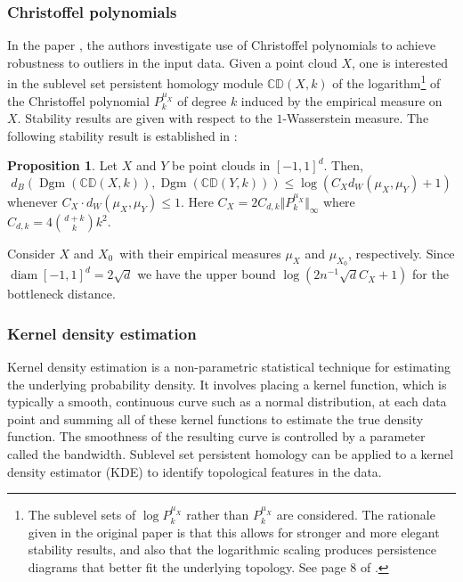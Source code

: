 \documentclass[10pt,a4paper]{article}
\theoremstyle{definition}
\newtheorem{prop}{Proposition}[thm]
\newcommand{\R}{\mathbb{R}}
\begin{document}
\subsubsection{Christoffel polynomials \autocite{Hoefgeest2022}}
In the paper \autocite{Hoefgeest2022}, the authors investigate use of Christoffel polynomials to achieve robustness to outliers in the input data. Given a point cloud $X$, one is interested in the sublevel set persistent homology module $\mathbb{CD}(X,k)$ of the logarithm\footnote{The sublevel sets of $\log P_k^{\mu_X}$ rather than $P_k^{\mu_X}$ are considered. The rationale given in the original paper is that this allows for stronger and more elegant stability results, and also that the logarithmic scaling produces persistence diagrams that better fit the underlying topology. See page 8 of \autocite{Hoefgeest2022}.} of the Christoffel polynomial $P_k^{\mu_X}$ of degree $k$ induced by the empirical measure on $X$. Stability results are given with respect to the $1$-Wasserstein measure. %
The following stability result is established in \autocite{Hoefgeest2022}:

\begin{prop}
	Let $X$ and $Y$ be point clouds in $[-1,1]^d$. Then,
	$$
	d_B\left(\operatorname{Dgm}(\mathbb{CD}(X,k)), \operatorname{Dgm}(\mathbb{CD}(Y,k))\right)\leq\log(C_X d_W(\mu_X, \mu_Y)+1)
	$$
	whenever $C_X\cdot d_W(\mu_X, \mu_Y)\leq 1$. Here $C_X = 2C_{d,k}\Vert P_k^{\mu_X}\Vert_\infty$ where $C_{d,k} = 4\binom{d+k}{k}k^2$.
\end{prop}

Consider $X$ and $X_0$ with their empirical measures $\mu_X$ and $\mu_{X_0}$, respectively. Since $\operatorname{diam}[-1,1]^d = 2\sqrt{d}$ we have the upper bound $\log\left(2n^{-1}\sqrt{d}C_X+1\right)$ for the bottleneck distance.


\subsubsection{Kernel density estimation}
Kernel density estimation is a non-parametric statistical technique for estimating the underlying probability density. It involves placing a kernel function, which is typically a smooth, continuous curve such as a normal distribution, at each data point and summing all of these kernel functions to estimate the true density function. The smoothness of the resulting curve is controlled by a parameter called the bandwidth. Sublevel set persistent homology can be applied to a kernel density estimator (KDE) to identify topological features in the data.
\end{document}
